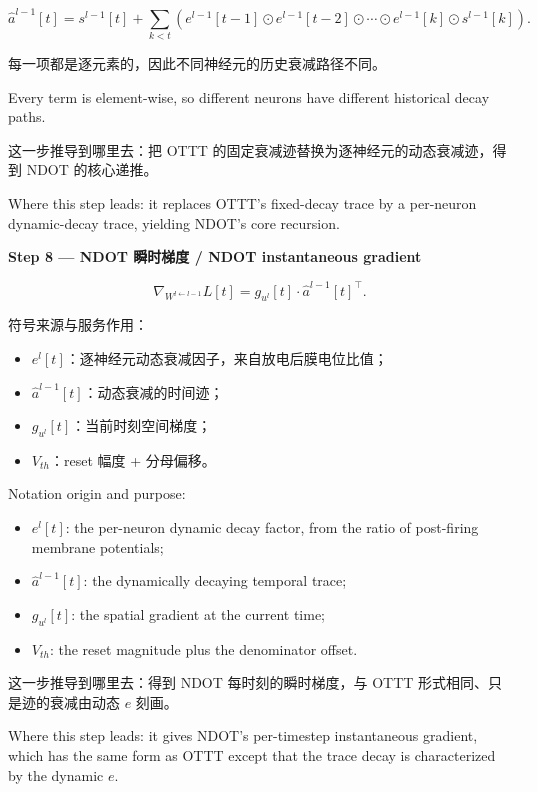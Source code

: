\documentclass[journal,12pt,onecolumn]{IEEEtran}
\begin{document}
\begin{equation}
\hat{a}^{l-1}[t] = s^{l-1}[t] + \sum_{k<t} \left( e^{l-1}[t-1] \odot e^{l-1}[t-2] \odot \cdots \odot e^{l-1}[k] \odot s^{l-1}[k] \right).
\end{equation}

每一项都是逐元素的，因此不同神经元的历史衰减路径不同。

Every term is element-wise, so different neurons have different historical decay paths.

这一步推导到哪里去：把 OTTT 的固定衰减迹替换为逐神经元的动态衰减迹，得到 NDOT 的核心递推。

Where this step leads: it replaces OTTT's fixed-decay trace by a per-neuron dynamic-decay trace, yielding NDOT's core recursion.

\medskip\noindent\textbf{Step 8 — NDOT 瞬时梯度 / NDOT instantaneous gradient}

\begin{equation}
\nabla_{W^{l\leftarrow l-1}} L[t] = g_{u^l}[t] \cdot \hat{a}^{l-1}[t]^{\top}.
\end{equation}

符号来源与服务作用：
\begin{itemize}[leftmargin=1.5em,itemsep=2pt]
\item $e^l[t]$：逐神经元动态衰减因子，来自放电后膜电位比值；
\item $\hat{a}^{l-1}[t]$：动态衰减的时间迹；
\item $g_{u^l}[t]$：当前时刻空间梯度；
\item $V_{th}$：reset 幅度 + 分母偏移。
\end{itemize}

Notation origin and purpose:
\begin{itemize}[leftmargin=1.5em,itemsep=2pt]
\item $e^l[t]$: the per-neuron dynamic decay factor, from the ratio of post-firing membrane potentials;
\item $\hat{a}^{l-1}[t]$: the dynamically decaying temporal trace;
\item $g_{u^l}[t]$: the spatial gradient at the current time;
\item $V_{th}$: the reset magnitude plus the denominator offset.
\end{itemize}

这一步推导到哪里去：得到 NDOT 每时刻的瞬时梯度，与 OTTT 形式相同、只是迹的衰减由动态 $e$ 刻画。

Where this step leads: it gives NDOT's per-timestep instantaneous gradient, which has the same form as OTTT except that the trace decay is characterized by the dynamic $e$.
\end{document}
